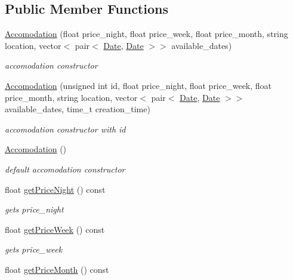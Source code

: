 \subsection*{Public Member Functions}
\begin{DoxyCompactItemize}
\item 
\hyperlink{class_accomodation_a6f9d474e6bf2cd77d0046c3584a50bc6}{Accomodation} (float price\+\_\+night, float price\+\_\+week, float price\+\_\+month, string location, vector$<$ pair$<$ \hyperlink{class_date}{Date}, \hyperlink{class_date}{Date} $>$$>$ available\+\_\+dates)
\begin{DoxyCompactList}\small\item\em accomodation constructor \end{DoxyCompactList}\item 
\hyperlink{class_accomodation_a0fd324ca8445d728a6f95aa949730f8a}{Accomodation} (unsigned int id, float price\+\_\+night, float price\+\_\+week, float price\+\_\+month, string location, vector$<$ pair$<$ \hyperlink{class_date}{Date}, \hyperlink{class_date}{Date} $>$$>$ available\+\_\+dates, time\+\_\+t creation\+\_\+time)
\begin{DoxyCompactList}\small\item\em accomodation constructor with id \end{DoxyCompactList}\item 
\hypertarget{class_accomodation_a7d8d798bd3a27d023dca18b909d4acf2}{}\label{class_accomodation_a7d8d798bd3a27d023dca18b909d4acf2} 
\hyperlink{class_accomodation_a7d8d798bd3a27d023dca18b909d4acf2}{Accomodation} ()
\begin{DoxyCompactList}\small\item\em default accomodation constructor \end{DoxyCompactList}\item 
float \hyperlink{class_accomodation_a9061a7cadf76377cbab25043e53ef5ef}{get\+Price\+Night} () const
\begin{DoxyCompactList}\small\item\em gets price\+\_\+night \end{DoxyCompactList}\item 
float \hyperlink{class_accomodation_ab466bd7dc51b8f48ac4e9152c96c95f7}{get\+Price\+Week} () const
\begin{DoxyCompactList}\small\item\em gets price\+\_\+week \end{DoxyCompactList}\item 
float \hyperlink{class_accomodation_a3e58fd8b7a752fb7c8709fcb979cfbb5}{get\+Price\+Month} () const

\end{DoxyCompactItemize}
